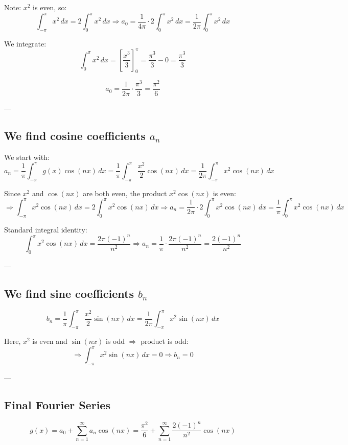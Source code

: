\documentclass{article}
\begin{document}
Note: \( x^2 \) is even, so:
\[
\int_{-\pi}^{\pi} x^2 \, dx = 2 \int_0^{\pi} x^2 \, dx
\Rightarrow a_0 = \frac{1}{4\pi} \cdot 2 \int_0^{\pi} x^2 \, dx = \frac{1}{2\pi} \int_0^{\pi} x^2 \, dx
\]

We integrate:
\[
\int_0^{\pi} x^2 \, dx = \left[ \frac{x^3}{3} \right]_0^{\pi} = \frac{\pi^3}{3} - 0 = \frac{\pi^3}{3}
\]

\[
a_0 = \frac{1}{2\pi} \cdot \frac{\pi^3}{3} = \frac{\pi^2}{6}
\]

---

\subsection*{We find cosine coefficients \( a_n \)}

We start with:
\[
a_n = \frac{1}{\pi} \int_{-\pi}^{\pi} g(x) \cos(nx) \, dx = \frac{1}{\pi} \int_{-\pi}^{\pi} \frac{x^2}{2} \cos(nx) \, dx = \frac{1}{2\pi} \int_{-\pi}^{\pi} x^2 \cos(nx) \, dx
\]

Since \( x^2 \) and \( \cos(nx) \) are both even, the product \( x^2 \cos(nx) \) is even:
\[
\Rightarrow \int_{-\pi}^{\pi} x^2 \cos(nx) \, dx = 2 \int_0^{\pi} x^2 \cos(nx) \, dx
\Rightarrow a_n = \frac{1}{2\pi} \cdot 2 \int_0^{\pi} x^2 \cos(nx) \, dx = \frac{1}{\pi} \int_0^{\pi} x^2 \cos(nx) \, dx
\]

Standard integral identity:
\[
\int_0^{\pi} x^2 \cos(nx) \, dx = \frac{2\pi (-1)^n}{n^2}
\Rightarrow a_n = \frac{1}{\pi} \cdot \frac{2\pi (-1)^n}{n^2} = \frac{2(-1)^n}{n^2}
\]

---

\subsection*{We find sine coefficients \( b_n \)}

\[
b_n = \frac{1}{\pi} \int_{-\pi}^{\pi} \frac{x^2}{2} \sin(nx) \, dx = \frac{1}{2\pi} \int_{-\pi}^{\pi} x^2 \sin(nx) \, dx
\]

Here, \( x^2 \) is even and \( \sin(nx) \) is odd \( \Rightarrow \) product is odd:
\[
\Rightarrow \int_{-\pi}^{\pi} x^2 \sin(nx) \, dx = 0 \Rightarrow b_n = 0
\]

---

\subsection*{Final Fourier Series}

\[
g(x) = a_0 + \sum_{n=1}^{\infty} a_n \cos(nx) = \frac{\pi^2}{6} + \sum_{n=1}^{\infty} \frac{2(-1)^n}{n^2} \cos(nx)
\]
\end{document}
